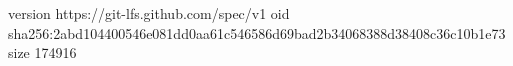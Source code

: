 version https://git-lfs.github.com/spec/v1
oid sha256:2abd104400546e081dd0aa61c546586d69bad2b34068388d38408c36c10b1e73
size 174916
